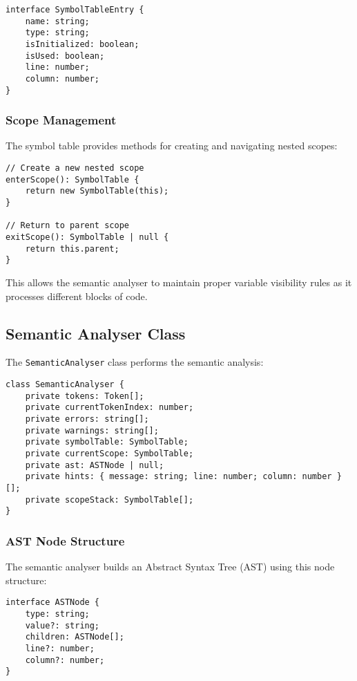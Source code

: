 \documentclass[12pt]{article}
\begin{document}
\begin{lstlisting}
interface SymbolTableEntry {
    name: string;
    type: string;
    isInitialized: boolean;
    isUsed: boolean;
    line: number;
    column: number;
}
\end{lstlisting}

\subsubsection{Scope Management}
The symbol table provides methods for creating and navigating nested scopes:

\begin{lstlisting}
// Create a new nested scope
enterScope(): SymbolTable {
    return new SymbolTable(this);
}

// Return to parent scope
exitScope(): SymbolTable | null {
    return this.parent;
}
\end{lstlisting}

This allows the semantic analyser to maintain proper variable visibility rules as it processes different blocks of code.

\subsection{Semantic Analyser Class}
The \texttt{SemanticAnalyser} class performs the semantic analysis:

\begin{lstlisting}
class SemanticAnalyser {
    private tokens: Token[];
    private currentTokenIndex: number;
    private errors: string[];
    private warnings: string[];
    private symbolTable: SymbolTable;
    private currentScope: SymbolTable;
    private ast: ASTNode | null;
    private hints: { message: string; line: number; column: number }[];
    private scopeStack: SymbolTable[];
}
\end{lstlisting}

\subsubsection{AST Node Structure}
The semantic analyser builds an Abstract Syntax Tree (AST) using this node structure:

\begin{lstlisting}
interface ASTNode {
    type: string;
    value?: string;
    children: ASTNode[];
    line?: number;
    column?: number;
}
\end{lstlisting}
\end{document}
